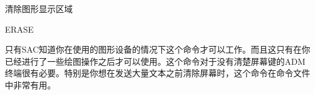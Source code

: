 \label{cmd:erase}

清除图形显示区域

\begin{SACSTX}
ERASE
\end{SACSTX}

只有SAC知道你在使用的图形设备的情况下这个命令才可以工作。而且这只有在你已经进行了一些绘图操作之后才可以使用。这个命令对于没有清楚屏幕键的ADM终端很有必要。特别是你想在发送大量文本之前清除屏幕时，这个命令在命令文件中非常有用。
